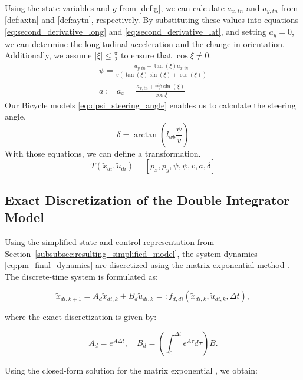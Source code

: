 Using the state variables and $g$ from \eqref{def:g}, we can calculate $a_{x,tn}$ and $a_{y,tn}$ from \eqref{def:axtn} and \eqref{def:aytn},
respectively.
By substituting these values into equations \eqref{eq:second_derivative_long} and \eqref{eq:second_derivative_lat}, and setting $a_y = 0$, we can
determine the longitudinal acceleration and the change in orientation.
Additionally, we assume $|\xi| \leq \frac{\pi}{2}$ to ensure that $\cos{\xi} \neq 0$.
\begin{align}
	\dot{\psi} = \frac{a_{y,tn} - \tan(\xi) a_{x,tn}}{v (\tan(\xi) \sin(\xi) + \cos(\xi))} \\
	a := a_x = \frac{a_{x,tn} + v \dot{\psi} \sin(\xi)}{\cos{\xi}}
\end{align}
Our Bicycle models \eqref{eq:dpsi_steering_angle} enables us to calculate the steering angle.
\begin{equation}
	\delta = \arctan(l_{wb}\frac{\dot{\psi}}{v})
\end{equation}
With those equations, we can define a transformation.
\begin{equation}
	T(\tilde{x}_{di}, \tilde{u}_{di}) = [p_x, p_y, \psi, \dot{\psi}, v, a, \delta] \label{eq:pm_state_transformation} \end{equation}

\subsection{Exact Discretization of the Double Integrator Model}

Using the simplified state and control representation from
Section~\ref{subsubsec:resulting_simplified_model}, the system dynamics \eqref{eq:pm_final_dynamics} are discretized using the matrix exponential
method \cite{kailath_linear_1980, ogata_modern_2010}.
The discrete-time system is formulated as:

\begin{equation}
	\label{eq:discrete_time_dynamics_di}
	\tilde{x}_{di, k+1} = A_d \tilde{x}_{di, k} + B_d \tilde{u}_{di, k} =: f_{d, di}(\tilde{x}_{di, k}, \tilde{u}_{di, k}, \Delta t),
\end{equation}

where the exact discretization is given by:

\begin{equation}
	A_d = e^{A \Delta t}, \quad B_d = \left( \int_0^{\Delta t} e^{A \tau} d\tau \right) B.
\end{equation}

Using the closed-form solution for the matrix exponential \cite{noauthor_matrix_nodate}, we obtain:

